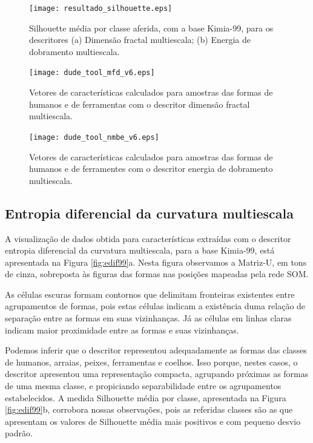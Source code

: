 \begin{figure}[h!]
  \caption{\label{fig:silhouette} Silhouette média por classe aferida, com a base Kimia-99, para os descritores (a) Dimensão fractal multiescala; (b) Energia de dobramento multiescala.}
  \centering
  \texttt{[image: resultado\_silhouette.eps]}
\end{figure}

\begin{figure}[h!]
  \caption{\label{fig:dude_tool_mfd}   Vetores de características calculados para amostras das formas de humanos e de ferramentas com o descritor dimensão fractal multiescala.}
  \centering
  \texttt{[image: dude\_tool\_mfd\_v6.eps]}
\end{figure}

\begin{figure}[h!]
  \caption{\label{fig:dude_tool_nmbe} Vetores de características calculados para amostras das formas de humanos e de ferramentes com o descritor energia de dobramento multiescala.}
  \centering
  \texttt{[image: dude\_tool\_nmbe\_v6.eps]}
\end{figure}

\subsection{Entropia diferencial da curvatura multiescala}

A visualização de dados obtida para características extraídas com o descritor entropia diferencial da curvatura multiescala, para a base Kimia-99, está apresentada na Figura \ref{fig:edif99}a. Nesta figura observamos a Matriz-U, em tons de cinza, sobreposta às figuras das formas nas posições mapeadas pela rede SOM.

As células escuras formam contornos que delimitam fronteiras existentes entre agrupamentos de formas, pois estas células indicam a existência duma relação de separação entre as formas em suas vizinhanças. Já as células em linhas claras indicam maior proximidade entre as formas e suas vizinhanças.

Podemos inferir que o descritor representou adequadamente as formas das classes de humanos, arraias, peixes, ferramentas e coelhos. Isso porque, nestes casos, o descritor apresentou uma representação compacta, agrupando próximas as formas de uma mesma classe, e propiciando separabilidade entre os agrupamentos estabelecidos. A medida Silhouette média por classe, apresentada na Figura \ref{fig:edif99}b, corrobora nossas observações, pois as referidas classes são as que apresentam os valores de Silhouette média mais positivos e com pequeno desvio padrão.  

